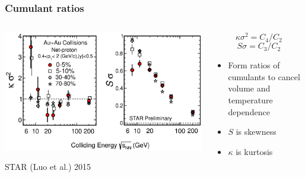 \documentclass[accentcolor=tud2c,usenames,dvipsnames,colorbacktitle,inverttitle,landscape,german,presentation,t]{tudbeamer}
\begin{document}
  \begin{frame}
    \frametitle{Cumulant ratios}
    \begin{columns}[c]
      \begin{column}{0.6\textwidth}
      \includegraphics[width=\textwidth]{figures/12/Energy_KV_SD}
      \begin{center}
        \footnotesize{STAR (Luo et al.) 2015}
      \end{center}
      \end{column}
      \begin{column}{0.4\textwidth}
        \begin{equation*}
          \kappa \sigma^2 = C_4 / C_2
        \end{equation*}
        \begin{equation*}
          S \sigma = C_3 / C_2
        \end{equation*}
        \begin{itemize}
          \item Form ratios of cumulants to cancel volume and temperature
            dependence
          \item $S$ is skewness
          \item $\kappa$ is kurtosis
        \end{itemize}
      \end{column}
    \end{columns}
  \end{frame}
\end{document}
